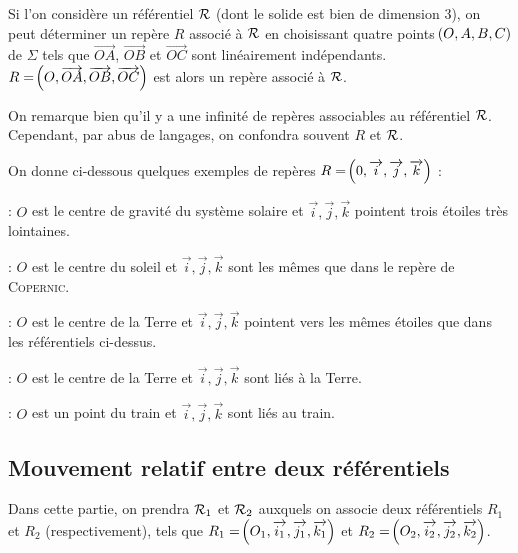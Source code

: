 \documentclass[a4paper,french,bookmarks]{book}
\begin{document}
    Si l'on considère un référentiel $\mathcal{R}$ (dont le solide est bien de dimension 3), on peut déterminer un repère $R$ associé à $\mathcal{R}$ en choisissant quatre points $\!\left(O, A, B, C\right)$ de $\Sigma$ tels que $\vec{OA}$, $\vec{OB}$ et $\vec{OC}$ sont linéairement indépendants. $R = \!\left(O, \overrightarrow{OA}, \overrightarrow{OB}, \overrightarrow{OC}\right)$ est alors un repère associé à $\mathcal{R}$.
    
    \begin{enumerate}
        \itt On remarque bien qu'il y a une infinité de repères associables au référentiel $\mathcal{R}$. Cependant, par abus de langages, on confondra souvent $R$ et $\mathcal{R}$.
    \end{enumerate}
    
    \begin{example}{}{}
        On donne ci-dessous quelques exemples de repères  $R = \!\left(0, \overrightarrow{i}, \overrightarrow{j}, \overrightarrow{k}\right)$ :
        \begin{enumerate}
            \itt {} : $O$ est le centre de gravité du système solaire et $\vec i, \vec j, \vec k$ pointent trois étoiles très lointaines.

            \itt {} : $O$ est le centre du soleil et $\vec i, \vec j, \vec k$ sont les mêmes que dans le repère de \textsc{Copernic}.
        
            \itt {} : $O$ est le centre de la Terre et $\vec i, \vec j, \vec k$ pointent vers les mêmes étoiles que dans les référentiels ci-dessus. 

            \itt {} : $O$ est le centre de la Terre et $\vec i, \vec j, \vec k$  sont liés à la Terre. 

            \itt {} : $O$ est un point du train et $\vec i, \vec j, \vec k$ sont liés au train.
        \end{enumerate}
    \end{example}
    
    \subsection{Mouvement relatif entre deux référentiels}
    
    Dans cette partie, on prendra $\mathcal{R}_1$ et $\mathcal{R}_2$ auxquels on associe deux référentiels $R_1$ et $R_2$ (respectivement), tels que $R_1 = \!\left(O_1, \overrightarrow{i_1}, \overrightarrow{j_1}, \overrightarrow{k_1}\right)$ et $R_2 = \!\left(O_2, \overrightarrow{i_2}, \overrightarrow{j_2}, \overrightarrow{k_2}\right)$.
    
\end{document}
